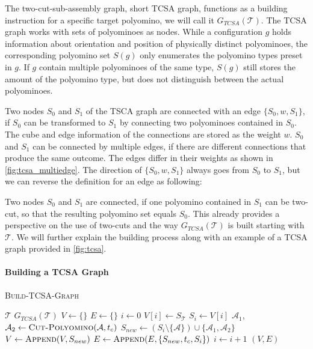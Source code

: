The two-cut-sub-assembly graph, short TCSA graph, functions as a building instruction for a specific target polyomino, we will call it $G_{\textit{TCSA}}(\mathcal{T})$.
The TCSA graph works with sets of polyominoes as nodes.
While a configuration $g$ holds information about orientation and position of physically distinct polyominoes, the corresponding polyomino set $S(g)$ only enumerates the polyomino types preset in $g$.
If $g$ contain multiple polyominoes of the same type, $S(g)$ still stores the amount of the polyomino type, but does not distinguish between the actual polyominoes.

Two nodes $S_0$ and $S_1$ of the TSCA graph are connected with an edge $\{S_0,w,S_1\}$, if $S_0$ can be transformed to $S_1$ by connecting two polyominoes contained in $S_0$.
The cube and edge information of the connections are stored as the weight $w$.
$S_0$ and $S_1$ can be connected by multiple edges, if there are different connections that produce the same outcome.
The edges differ in their weights as shown in \autoref{fig:tcsa_multiedge}.
The direction of $\{S_0,w,S_1\}$ always goes from $S_0$ to $S_1$, but we can reverse the definition for an edge as following:

Two nodes $S_0$ and $S_1$ are connected, if one polyomino contained in $S_1$ can be two-cut, so that the resulting polyomino set equals $S_0$.
This already provides a perspective on the use of two-cuts and the way $G_{\textit{TCSA}}(\mathcal{T})$ is built starting with $\mathcal{T}$.
We will further explain the building process along with an example of a TCSA graph provided in \autoref{fig:tcsa}.


\paragraph{Building a TCSA Graph}

\begin{algorithm}
	\caption{\scshape Build-TCSA-Graph}
	\label{algo:build_tcsa}
	\begin{algorithmic}[1]
		\REQUIRE $\mathcal{T}$
		\ENSURE $G_{\textit{TCSA}}(\mathcal{T})$  
		\STATE $V \gets \{\}$
		\STATE $E \gets \{\}$
		\STATE $i \gets 0$
		\STATE $V[i] \gets S_\mathcal{T}$
			\STATE $S_i \gets V[i]$
					\STATE $\mathcal{A}_1$,$\mathcal{A}_2 \gets \text{\scshape Cut-Polyomino}(\mathcal{A}, t_c)$
					\STATE $S_{new} \gets \left( S_i \setminus \{\mathcal{A}\} \right) \cup \{\mathcal{A}_1, \mathcal{A}_2\}$ 
						\STATE $V \gets \text{\scshape Append}(V, S_{new})$
					\ENDIF
					\STATE $E \gets \text{\scshape Append}(E, \{S_{new}, t_c, S_i\})$
				\ENDFOR
			\ENDFOR
			\STATE $i \gets i+1$
		\ENDWHILE
		\RETURN $(V,E)$
	\end{algorithmic}
\end{algorithm}


